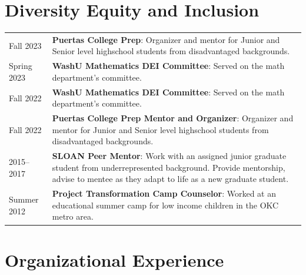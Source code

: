 \documentclass[margin,line,pifont,palatino,courier]{res}
\begin{document}
\begin{resume}
\begin{tabular}{@{}p{1.2in}p{3in}}
\end{tabular}


\section{\sc Diversity Equity and Inclusion}

\begin{tabular}{@{}p{1.2in}p{3in}}
Fall 2023 & \textbf{Puertas College Prep}: Organizer and mentor for Junior and Senior level highschool students from disadvantaged backgrounds. \\
Spring 2023 & \textbf{WashU Mathematics DEI Committee}: Served on the math department's committee. \\
Fall 2022 & \textbf{WashU Mathematics DEI Committee}: Served on the math department's committee. \\
Fall 2022 & \textbf{Puertas College Prep Mentor and Organizer}: Organizer and mentor for Junior and Senior level highschool students from disadvantaged backgrounds. \\
2015--2017 & \textbf{SLOAN Peer Mentor}: Work with an assigned junior graduate student from underrepresented background. Provide mentorship, advise to mentee as they adapt to life as a new graduate student.\\
Summer 2012 & \textbf{Project Transformation Camp Counselor}: Worked at an educational summer camp for low income children in the OKC metro area.
\end{tabular}

\section{\sc Organizational Experience}


\end{resume}
\end{document}
